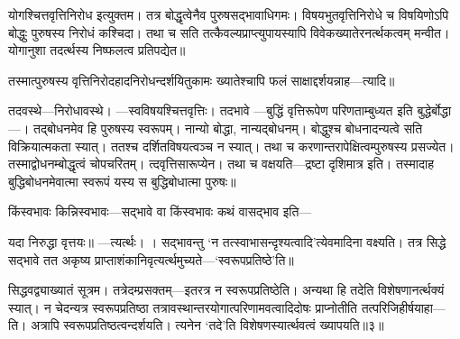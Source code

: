 योगश्चित्तवृत्तिनिरोध इत्युक्तम। तत्र बोद्धृत्वेनैव पुरुषसद्भावाधिगमः। विषयभुतवृत्तिनिरोधे च विषयिणोऽपि बोद्धुः पुरुषस्य निरोधं कश्चिदा। तथा च सति तत्कैवल्यप्राप्त्युपायस्यापि विवेकख्यातेरनर्त्थकत्वम् मन्वीत। योगानुशा तदर्त्थस्य निष्फलत्व प्रतिपद्येत॥

तस्मात्पुरुषस्य वृत्तिनिरोदहादनिरोधन्दर्शयितुकामः ख्यातेश्चापि फलं साक्षाद्दर्शयन्नाह---त्यादि॥

तदवस्थे---निरोधावस्थे। ---स्वविषयश्चित्तवृत्तिः। तदभावे ---बुद्धिं वृत्तिरूपेण परिणताम्बुध्यत इति बुद्धेर्बोद्धा---। तद्बोधनमेव हि पुरुषस्य स्वरूपम्। नान्यो बोद्धा, नान्यद्बोधनम्। बोद्धुश्च बोधनादन्यत्वे सति विक्रियात्मकता स्यात्। ततश्च दर्शितविषयत्वञ्च न स्यात्। तथा च करणान्तरापेक्षित्वम्पुरुषस्य प्रसज्येत। तस्माद्वोधनम्बोद्धृत्वं चोपचरितम्। त्दवृत्तिसारूप्येन। तथा च वक्षयति---द्रष्टा दृशिमात्र इति। तस्मादाह बुद्धिबोधनमेवात्मा स्वरूपं यस्य स बुद्धिबोधात्मा पुरुषः॥

किंस्वभावः किन्निस्वभावः---सद्भावे वा किंस्वभावः कथं वासद्भाव इति---


यदा निरुद्धा वृत्तयः॥
---त्यर्त्थः। ।  सद्भावन्तु `न तत्स्वाभासन्दृश्यत्वादि'त्येवमादिना वक्ष्यति। तत्र सिद्धे सद्भावे तत अकृष्य प्राप्ताशंकानिवृत्यर्त्थमुच्यते---`स्वरूपप्रतिष्ठे'ति॥

सिद्धवद्व्याख्यातं सूत्रम। तत्रेदम्प्रसक्तम्---इतरत्र न स्वरूपप्रतिष्ठेति। अन्यथा हि तदेति विशेषणानर्त्थक्यं स्यात्। न चेदन्यत्र स्वरूपप्रतिष्ठा तत्रावस्थान्तरयोगात्परिणामवत्वादिदोषः प्राप्नोतीति तत्परिजिहीर्षयाहा---ति। अत्रापि स्वरूपप्रतिष्ठत्वन्दर्शयति। त्यनेन `तदे'ति विशेषणस्यार्त्थवत्वं ख्यापयति॥३॥
